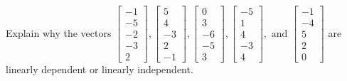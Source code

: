 \documentclass{article}
\begin{document}
\begin{exerciseStatement}
    Explain why the vectors \(\left[\begin{array}{r}
-1 \\
-5 \\
-2 \\
-3 \\
2
\end{array}\right] , \left[\begin{array}{r}
5 \\
4 \\
-3 \\
2 \\
-1
\end{array}\right] , \left[\begin{array}{r}
0 \\
3 \\
-6 \\
-5 \\
3
\end{array}\right] , \left[\begin{array}{r}
-5 \\
1 \\
4 \\
-3 \\
4
\end{array}\right] , \text{ and } \left[\begin{array}{r}
-1 \\
-4 \\
5 \\
2 \\
0
\end{array}\right]\) are linearly dependent or linearly independent.


  
\end{exerciseStatement}
\end{document}
